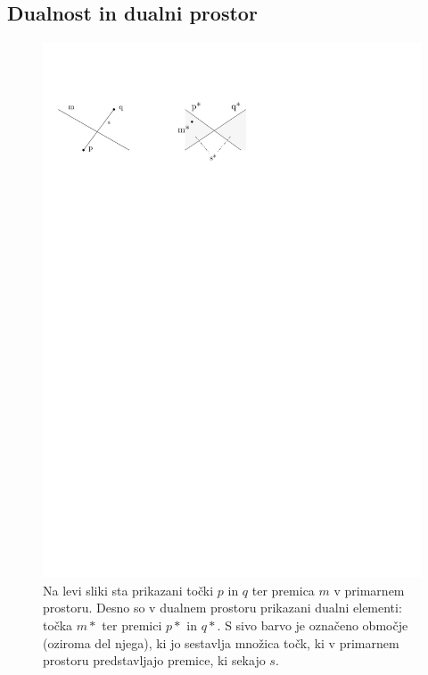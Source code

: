 \documentclass[a4paper, 12pt]{book}
\begin{document}
\subsection{Dualnost in dualni prostor}
\label{dual-chapter}
\begin{figure}
\centerline{\includegraphics[scale=1]{pics/dual-lines-example.pdf}}
\caption{Na levi sliki sta prikazani točki $p$ in $q$ ter premica $m$ v primarnem prostoru. Desno so v dualnem prostoru prikazani dualni elementi: točka $m*$ ter premici $p*$ in $q*$. S sivo barvo je označeno območje (oziroma del njega), ki jo sestavlja množica točk, ki v primarnem prostoru predstavljajo premice, ki sekajo $s$.} 
\label{dual-ex}
\end{figure}
\end{document}
